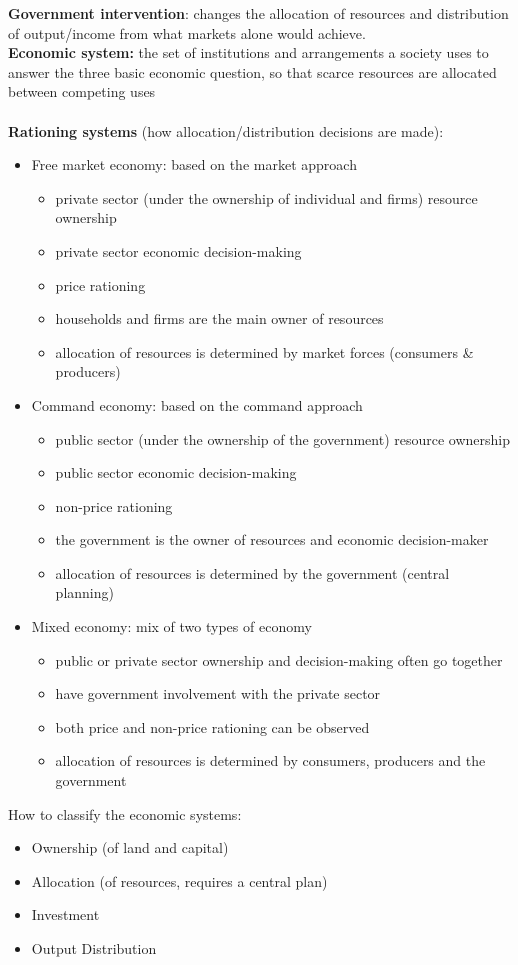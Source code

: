 \textbf{Government intervention}: changes the allocation of resources and distribution of output/income from what markets alone would achieve.\\
\textbf{Economic system:} the set of institutions and arrangements a society uses to answer the three basic economic question, so that scarce resources are allocated between competing uses\\\\
\textbf{Rationing systems} (how allocation/distribution decisions are made):
\begin{itemize}
  \item Free market economy: based on the market approach
  \begin{itemize}
    \item private sector (under the ownership of individual and firms) resource ownership
    \item private sector economic decision-making
    \item price rationing
    \item households and firms are the main owner of resources
    \item allocation of resources is determined by market forces (consumers \& producers)
  \end{itemize}
  \item Command economy: based on the command approach
  \begin{itemize}
    \item public sector (under the ownership of the government) resource ownership
    \item public sector economic decision-making
    \item non-price rationing
    \item the government is the owner of resources and economic decision-maker
    \item allocation of resources is determined by the government (central planning)
  \end{itemize}
  \item Mixed economy: mix of two types of economy
  \begin{itemize}
    \item public or private sector ownership and decision-making often go together
    \item have government involvement with the private sector
    \item both price and non-price rationing can be observed
    \item allocation of resources is determined by consumers, producers and the government
  \end{itemize}
\end{itemize}
How to classify the economic systems:
\begin{itemize}
\item Ownership (of land and capital)
\item Allocation (of resources, requires a central plan)
\item Investment
\item Output Distribution
\end{itemize}
